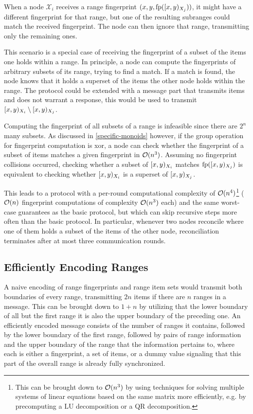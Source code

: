When a node $\mathcal{X}_i$ receives a range fingerprint $({x}, {y}, {\operatorname{fp}([{x},{y})_{X_j})})$, it might have a different fingerprint for that range, but one of the resulting subranges could match the received fingerprint. The node can then ignore that range, transmitting only the remaining ones.

This scenario is a special case of receiving the fingerprint of a subset of the items one holds within a range. In principle, a node can compute the fingerprints of arbitrary subsets of its range, trying to find a match. If a match is found, the node knows that it holds a superset of the items the other node holds within the range. The protocol could be extended with a message part that transmits items and does not warrant a response, this would be used to transmit $[{x},{y})_{X_i} \setminus [{x},{y})_{X_j}$.

Computing the fingerprint of all subsets of a range is infeasible since there are $2^n$ many subsets. As discussed in \cref{specific-monoids} however, if the group operation for fingerprint computation is xor, a node can check whether the fingerprint of a subset of items matches a given fingerprint in $\mathcal{O}(n^3)$.
Assuming no fingerprint collisions occurred, checking whether a subset of $[{x},{y})_{X_i}$ matches $\operatorname{fp}([{x},{y})_{X_j})$ is equivalent to checking whether $[{x},{y})_{X_i}$ is a superset of $[{x},{y})_{X_j}$.

This leads to a protocol with a per-round computational complexity of $\mathcal{O}(n^4)$\footnote{This can be brought down to $\mathcal{O}(n^3)$ by using techniques for solving multiple systems of linear equations based on the same matrix more efficiently, e.g. by precomputing a LU decomposition or a QR decomposition.} ($\mathcal{O}(n)$ fingerprint computations of complexity $\mathcal{O}(n^3)$ each) and the same worst-case guarantees as the basic protocol, but which can skip recursive steps more often than the basic protocol. In particular, whenever two nodes reconcile where one of them holds a subset of the items of the other node, reconciliation terminates after at most three communication rounds.

\subsection{Efficiently Encoding Ranges}

A naive encoding of range fingerprints and range item sets would transmit both boundaries of every range, transmitting $2n$ items if there are $n$ ranges in a message. This can be brought down to $1 + n$ by utilizing that the lower boundary of all but the first range it is also the upper boundary of the preceding one. An efficiently encoded message consists of the number of ranges it contains, followed by the lower boundary of the first range, followed by pairs of range information and the upper boundary of the range that the information pertains to, where each  is either a fingerprint, a set of items, or a dummy value signaling that this part of the overall range is already fully synchronized.

